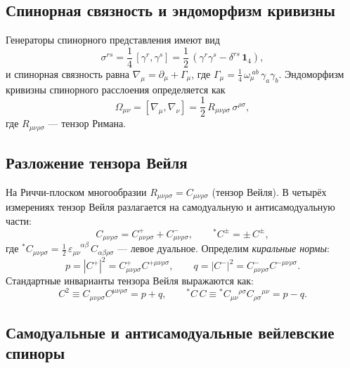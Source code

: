 \documentclass[12pt,a4paper]{article}
\theoremstyle{definition}
\theoremstyle{remark}
\newcommand{\Weylsq}{C_{\mu\nu\rho\sigma}C^{\mu\nu\rho\sigma}}
\newcommand{\dualCC}{\!{}^{\ast}\!C_{\mu\nu}{}^{\rho\sigma}C_{\rho\sigma}{}^{\mu\nu}}
\begin{document}
\subsection{Спинорная связность и эндоморфизм кривизны}

Генераторы спинорного представления имеют вид
\begin{equation}\label{eq:sigma}
  \sigma^{rs} = \frac{1}{4}\,[\gamma^r, \gamma^s]
  = \frac{1}{2}\,(\gamma^r \gamma^s - \delta^{rs}\,\mathbf{1}_4),
\end{equation}
и спинорная связность равна
$\nabla_\mu = \partial_\mu + \Gamma_\mu$, где
$\Gamma_\mu = \frac{1}{4}\,\omega_\mu^{\;ab}\,\gamma_a\gamma_b$.
Эндоморфизм кривизны спинорного расслоения определяется как
\begin{equation}\label{eq:Omega}
  \Omega_{\mu\nu} = [\nabla_\mu, \nabla_\nu]
  = \frac{1}{2}\,R_{\mu\nu\rho\sigma}\,\sigma^{\rho\sigma},
\end{equation}
где $R_{\mu\nu\rho\sigma}$ --- тензор Римана.

\subsection{Разложение тензора Вейля}

На Риччи-плоском многообразии $R_{\mu\nu\rho\sigma} = C_{\mu\nu\rho\sigma}$
(тензор Вейля).  В четырёх измерениях тензор Вейля разлагается на
самодуальную и антисамодуальную части:
\begin{equation}
  C_{\mu\nu\rho\sigma} = C^+_{\mu\nu\rho\sigma} + C^-_{\mu\nu\rho\sigma},
  \qquad
  {}^{\ast}\!C^{\pm} = \pm\, C^{\pm},
\end{equation}
где ${}^{\ast}\!C_{\mu\nu\rho\sigma}
= \frac{1}{2}\,\varepsilon_{\mu\nu}^{\phantom{\mu\nu}\alpha\beta}\,
C_{\alpha\beta\rho\sigma}$ --- левое дуальное.  Определим \emph{киральные
нормы}:
\begin{equation}\label{eq:pq-def}
  p = |C^+|^2 = C^+_{\mu\nu\rho\sigma} C^{+\mu\nu\rho\sigma}, \qquad
  q = |C^-|^2 = C^-_{\mu\nu\rho\sigma} C^{-\mu\nu\rho\sigma}.
\end{equation}
Стандартные инварианты тензора Вейля выражаются как:
\begin{equation}\label{eq:weyl-pq}
  C^2 \equiv \Weylsq = p + q, \qquad
  {}^{\ast}\!C\,C \equiv \dualCC = p - q.
\end{equation}

\subsection{Самодуальные и антисамодуальные вейлевские спиноры}
\end{document}
